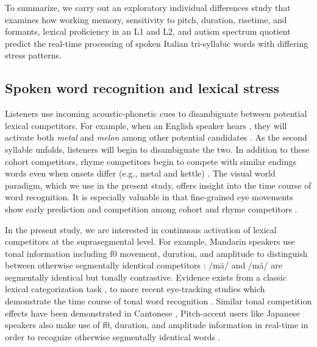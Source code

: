 To summarize, we carry out an exploratory individual differences study that examines how working memory, sensitivity to pitch, duration, risetime, and formants, lexical proficiency in an L1 and L2, and autism spectrum quotient predict the real-time processing of spoken Italian tri-syllabic words with differing stress patterns.

\subsection{Spoken word recognition and lexical stress}

Listeners use incoming acoustic-phonetic cues to disambiguate between potential lexical competitors. For example, when an English speaker hears , they will activate both \textit{metal} and \textit{melon} among other potential candidates \citep{Marslen1980}. As the second syllable unfolds, listeners will begin to disambiguate the two. In addition to these cohort competitors, rhyme competitors begin to compete with similar endings words even when onsets differ (e.g., metal and kettle) \citep{Allopenna_1998}. The visual world paradigm, which we use in the present study, offers insight into the time course of word recognition. It is especially valuable in that fine-grained eye movements show early prediction and competition among cohort and rhyme competitors \citep{Allopenna_1998}.

In the present study, we are interested in continuous activation of lexical competitors at the suprasegmental level. For example, Mandarin speakers use tonal information including f0 movement, duration, and amplitude \cite[e.g.,][]{Zhang2022} to distinguish between otherwise segmentally identical competitors \cite{Lee2008}: /m\=a/ and /m\'a/ are segmentally identical but tonally contrastive. Evidence exists from a classic lexical categorization task \citep{fox_1985},  to more recent eye-tracking studies which demonstrate the time course of tonal word recognition \citep{zou_2022}. Similar tonal competition effects have been demonstrated in Cantonese \citep{qin_2022,Nixon2016}, Pitch-accent users like Japanese speakers also make use of f0, duration, and amplitude information in real-time in order to recognize otherwise segmentally identical words \citep{goss_2014,Cutler1999,Ito2024}.

